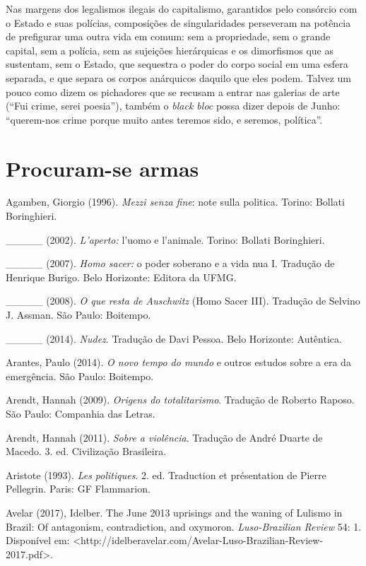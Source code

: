 Nas margens dos legalismos ilegais do capitalismo, garantidos pelo
consórcio com o Estado e suas polícias, composições de singularidades
perseveram na potência de prefigurar uma outra vida em comum: sem a
propriedade, sem o grande capital, sem a polícia, sem as sujeições
hierárquicas e os dimorfismos que as sustentam, sem o Estado, que
sequestra o poder do corpo social em uma esfera separada, e que separa
os corpos anárquicos daquilo que eles podem. Talvez um pouco como dizem
os pichadores que se recusam a entrar nas galerias de arte (``Fui crime,
serei poesia''), também o \emph{black bloc} possa dizer depois de Junho:
``querem-nos crime porque muito antes teremos sido, e seremos,
política''.

\chapter{Procuram-se armas}

Agamben, Giorgio (1996). \emph{Mezzi senza fine}: note sulla politica.
Torino: Bollati Boringhieri.

\_\_\_\_\_ (2002). \emph{L'aperto: }l'uomo e l'animale. Torino: Bollati
Boringhieri.

\_\_\_\_\_ (2007). \emph{Homo sacer: }o poder soberano e a vida nua I.
Tradução de Henrique Burigo. Belo Horizonte: Editora da UFMG.

\_\_\_\_\_ (2008). \emph{O que resta de Auschwitz} (Homo Sacer III).
Tradução de Selvino J. Assman. São Paulo: Boitempo.

\_\_\_\_\_ (2014). \emph{Nudez}. Tradução de Davi Pessoa. Belo
Horizonte: Autêntica.

Arantes, Paulo (2014). \emph{O novo tempo do mundo }e outros estudos
sobre a era da emergência. São Paulo: Boitempo.

Arendt, Hannah (2009). \emph{Origens do totalitarismo}. Tradução de
Roberto Raposo. São Paulo: Companhia das Letras.

Arendt, Hannah (2011). \emph{Sobre a violência}. Tradução de André
Duarte de Macedo. 3. ed. Civilização Brasileira.

Aristote (1993). \emph{Les politiques}. 2. ed. Traduction et
présentation de Pierre Pellegrin. Paris: GF Flammarion.

Avelar (2017), Idelber. The June 2013 uprisings and the waning of
Lulismo in Brazil: Of antagonism, contradiction, and oxymoron.
\emph{Luso-Brazilian Review} 54: 1. Disponível em:
\textless{}http://idelberavelar.com/Avelar-Luso-Brazilian-Review-2017.pdf\textgreater{}.

